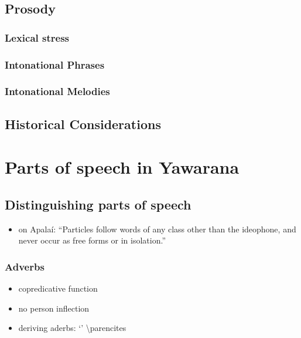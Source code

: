 \documentclass{memoir}
\begin{document}
\section{\texorpdfstring{Prosody \label{sec:prosody}}{Prosody }}

\subsection{\texorpdfstring{Lexical stress
\label{sec:stress}}{Lexical stress }}

\subsection{\texorpdfstring{Intonational Phrases
\label{sec:intphrases}}{Intonational Phrases }}

\subsection{\texorpdfstring{Intonational Melodies
\label{sec:intmelodies}}{Intonational Melodies }}

\section{\texorpdfstring{Historical Considerations
\label{sec:histphono}}{Historical Considerations }}

\chapter{\texorpdfstring{Parts of speech in Yawarana
\label{POS}}{Parts of speech in Yawarana }}

\section{Distinguishing parts of speech}

\begin{itemize}
\tightlist
\item
  \textcites[111]{koehn1986apalai} on Apalaí: ``Particles follow words
  of any class other than the ideophone, and never occur as free forms
  or in isolation.''
\end{itemize}

\subsection{Adverbs}

\begin{itemize}
\tightlist
\item
  copredicative function
\item
  no person inflection
\item
  deriving aderbs:  `' \textbackslash parencites
\end{itemize}
\end{document}
